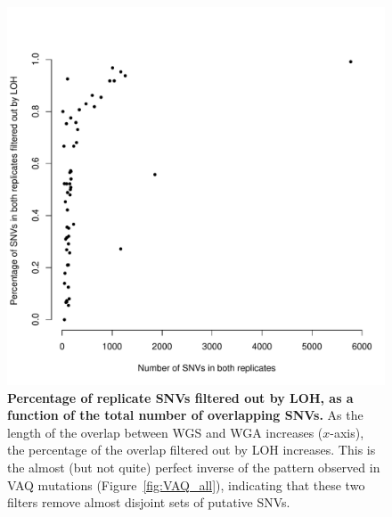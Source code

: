 \documentclass[11 pt]{article} %
\begin{document}
\begin{figure}
\centerline{
\includegraphics[width=5in]{Figure7.pdf} }
\caption{\textbf{Percentage of replicate SNVs filtered out by LOH, as a function of the total number of overlapping SNVs.} As the length of the overlap between WGS and WGA increases ($x$-axis), the percentage of the overlap filtered out by LOH increases. This is the almost (but not quite) perfect inverse of the pattern observed in VAQ mutations (Figure~\ref{fig:VAQ_all}), indicating that these two filters remove almost disjoint sets of putative SNVs.}
\label{fig:LOH_all}
\end{figure}
\end{document}
